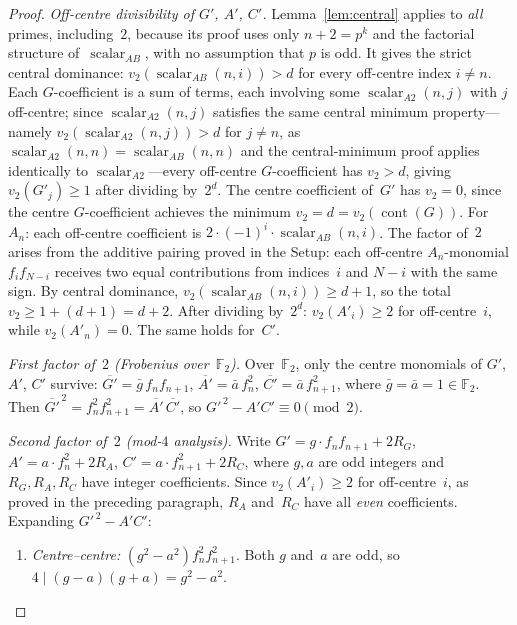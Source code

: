 \documentclass[10pt]{amsart}
\theoremstyle{definition}
\theoremstyle{remark}
\DeclareMathOperator{\cont}{cont}
\newcommand{\BF}{\mathbb{F}}
\begin{document}
\begin{proof}
\smallskip\noindent\emph{Off-centre divisibility of $G'$, $A'$, $C'$.}
Lemma~\ref{lem:central} applies to \emph{all} primes,
including~$2$, because its proof uses only $n+2 = p^k$ and
the factorial structure of~$\operatorname{scalar}_{AB}$, with no
assumption that $p$ is odd.  It gives the strict central dominance:
$v_2(\operatorname{scalar}_{AB}(n,i)) > d$ for every off-centre
index $i \ne n$.  Each $G$-coefficient is a sum of terms, each
involving some $\operatorname{scalar}_{A2}(n,j)$ with $j$ off-centre;
since $\operatorname{scalar}_{A2}(n,j)$ satisfies the same central minimum
property---namely $v_2(\operatorname{scalar}_{A2}(n,j)) > d$ for $j\ne n$,
as $\operatorname{scalar}_{A2}(n,n) = \operatorname{scalar}_{AB}(n,n)$
and the central-minimum proof applies identically to
$\operatorname{scalar}_{A2}$---every off-centre $G$-coefficient
has $v_2 > d$, giving $v_2(G'_j) \ge 1$ after dividing by~$2^d$.
The centre coefficient of~$G'$ has $v_2 = 0$, since the centre
$G$-coefficient achieves the minimum $v_2 = d = v_2(\cont(G))$.
For~$A_n$: each off-centre coefficient is
$2\cdot(-1)^i\cdot\operatorname{scalar}_{AB}(n,i)$.  The factor of~$2$
arises from the additive pairing proved in the Setup: each off-centre
$A_n$-monomial $f_if_{N-i}$ receives two equal contributions from
indices~$i$ and $N{-}i$ with the same sign.  By central dominance,
$v_2(\operatorname{scalar}_{AB}(n,i)) \ge d+1$, so the total
$v_2 \ge 1 + (d+1) = d+2$.  After dividing by~$2^d$:
$v_2(A'_i) \ge 2$ for off-centre~$i$, while $v_2(A'_n) = 0$.
The same holds for~$C'$.

\smallskip\noindent\emph{First factor of~$2$ (Frobenius over~$\BF_2$).}
Over~$\BF_2$, only the centre monomials of $G'$, $A'$, $C'$ survive:
$\overline{G'} = \bar g\, f_nf_{n+1}$,\;
$\overline{A'} = \bar a\, f_n^2$,\;
$\overline{C'} = \bar a\, f_{n+1}^2$,
where $\bar g = \bar a = 1 \in \BF_2$.  Then
$\overline{G'}^{\,2} = f_n^2f_{n+1}^2 = \overline{A'}\,\overline{C'}$,
so $G'^{\,2}-A'C' \equiv 0\pmod{2}$.

\smallskip\noindent\emph{Second factor of~$2$ (mod-$4$ analysis).}
Write $G' = g\cdot f_nf_{n+1} + 2R_G$, $A' = a\cdot f_n^2 + 2R_A$,
$C' = a\cdot f_{n+1}^2 + 2R_C$, where $g,a$ are odd integers and
$R_G,R_A,R_C$ have integer coefficients.  Since $v_2(A'_i)\ge 2$ for
off-centre~$i$, as proved in the preceding paragraph,
$R_A$ and~$R_C$ have all \emph{even}
coefficients.  Expanding $G'^{\,2}-A'C'$:
\begin{enumerate}[label=(\roman*)]
\item \emph{Centre--centre:}
  $(g^2-a^2)f_n^2f_{n+1}^2$.
  Both $g$ and~$a$ are odd, so $4\mid(g{-}a)(g{+}a) = g^2-a^2$.


\end{enumerate}
\end{proof}
\end{document}
